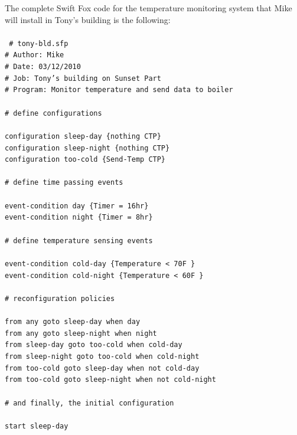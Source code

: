 \documentclass[11pt]{article}
\begin{document}
\newpage
The complete Swift Fox code for the temperature monitoring system that Mike
will install in Tony's building is the following:			\\
\\
\texttt{
\# tony-bld.sfp								\\
\# Author:   Mike							\\
\# Date:  03/12/2010							\\
\# Job:  Tony's building on Sunset Part					\\
\# Program:  Monitor temperature and send data to boiler 		\\
\\
\# define configurations 						\\
\\
configuration sleep-day \{nothing CTP\} 				\\
configuration sleep-night \{nothing CTP\}				\\
configuration too-cold \{Send-Temp CTP\}				\\
\\
\# define time passing events						\\
\\
event-condition day \{Timer = 16hr\} 					\\
event-condition night \{Timer = 8hr\}					\\
\\
\# define temperature sensing events					\\
\\
event-condition cold-day \{Temperature < 70F \}				\\
event-condition cold-night \{Temperature < 60F \}			\\
\\
\# reconfiguration policies						\\
\\
from any goto sleep-day when day					\\
from any goto sleep-night when night					\\
from sleep-day goto too-cold when cold-day				\\
from sleep-night goto too-cold when cold-night				\\
from too-cold goto sleep-day when not cold-day				\\
from too-cold goto sleep-night when not cold-night			\\
\\
\# and finally, the initial configuration				\\
\\
start sleep-day								\\
}
\end{document}
